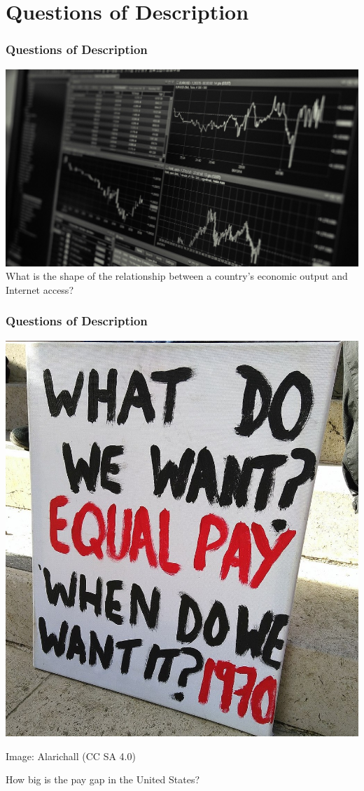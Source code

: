 \documentclass[12pt, block=fill]{beamer}
\begin{document}

\section{Questions of Description}

\begin{frame}

  \frametitle{Questions of Description}
    \includegraphics[width = \textwidth]{images/gdp}
    What is the shape of the relationship between a country's
    economic output and Internet access?
\end{frame}

\begin{frame}
  \frametitle{Questions of Description}
   \begin{center} \includegraphics[width = .5\textwidth]{images/equal_pay}
    
  \vspace{-.8cm} \footnotesize Image: Alarichall (CC SA 4.0)
   \end{center}
   
    How big is the pay gap in the United States? 
\end{frame}
\end{document}
